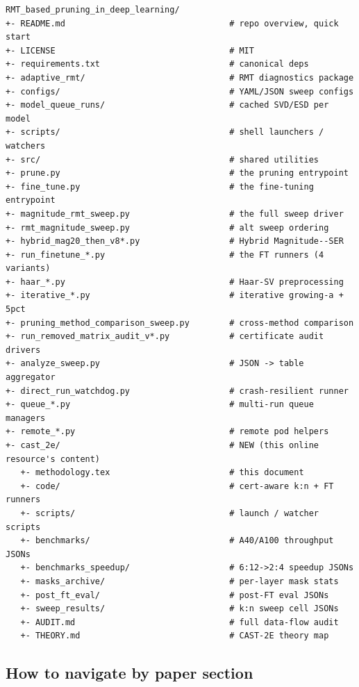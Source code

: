 \documentclass[11pt]{article}
\theoremstyle{plain}
\theoremstyle{definition}
\theoremstyle{remark}
\newcommand{\1}{\mathbf{1}}
\begin{document}
\begin{lstlisting}[caption={Top-level repository layout.},label=lst:tree-top]
RMT_based_pruning_in_deep_learning/
+- README.md                                 # repo overview, quick start
+- LICENSE                                   # MIT
+- requirements.txt                          # canonical deps
+- adaptive_rmt/                             # RMT diagnostics package
+- configs/                                  # YAML/JSON sweep configs
+- model_queue_runs/                         # cached SVD/ESD per model
+- scripts/                                  # shell launchers / watchers
+- src/                                      # shared utilities
+- prune.py                                  # the pruning entrypoint
+- fine_tune.py                              # the fine-tuning entrypoint
+- magnitude_rmt_sweep.py                    # the full sweep driver
+- rmt_magnitude_sweep.py                    # alt sweep ordering
+- hybrid_mag20_then_v8*.py                  # Hybrid Magnitude--SER
+- run_finetune_*.py                         # the FT runners (4 variants)
+- haar_*.py                                 # Haar-SV preprocessing
+- iterative_*.py                            # iterative growing-a + 5pct
+- pruning_method_comparison_sweep.py        # cross-method comparison
+- run_removed_matrix_audit_v*.py            # certificate audit drivers
+- analyze_sweep.py                          # JSON -> table aggregator
+- direct_run_watchdog.py                    # crash-resilient runner
+- queue_*.py                                # multi-run queue managers
+- remote_*.py                               # remote pod helpers
+- cast_2e/                                  # NEW (this online resource's content)
   +- methodology.tex                        # this document
   +- code/                                  # cert-aware k:n + FT runners
   +- scripts/                               # launch / watcher scripts
   +- benchmarks/                            # A40/A100 throughput JSONs
   +- benchmarks_speedup/                    # 6:12->2:4 speedup JSONs
   +- masks_archive/                         # per-layer mask stats
   +- post_ft_eval/                          # post-FT eval JSONs
   +- sweep_results/                         # k:n sweep cell JSONs
   +- AUDIT.md                               # full data-flow audit
   +- THEORY.md                              # CAST-2E theory map
\end{lstlisting}

\subsection{How to navigate by paper section}
\end{document}
